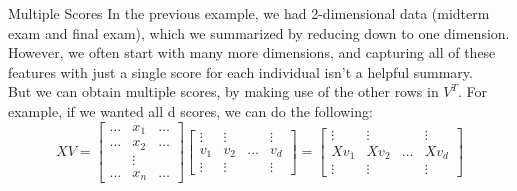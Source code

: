 \documentclass[aspectratio=169]{../latex_main/tntbeamer}  %
\begin{document}
	
	\begin{frame}{Multiple Scores}
	    In the previous example, we had 2-dimensional data (midterm exam and final exam), which we summarized by reducing down to one dimension.\\
	    However, we often start with many more dimensions, and capturing all of these features with just a single score for each individual isn’t a helpful summary. \\
	    But we can obtain multiple scores, by making use of the other rows in $V^T$. For example, if we wanted all d scores, we can do the following:
	    \begin{equation*}
	        XV = \left[\begin{array}{ccc}
	           \dots  &  x_1 & \dots \\
	           \dots  &  x_2 & \dots \\
	                  & \vdots & \\
	           \dots  & x_n  & \dots       
	        \end{array}\right]
	        \left[\begin{array}{cccc}
	           \vdots  &  \vdots &  &  \vdots \\
	           v_1     &  v_2    & \dots &  v_d \\
	           \vdots  & \vdots  &    & \vdots   
	        \end{array}\right] = \left[\begin{array}{cccc}
	           \vdots  &  \vdots &  &  \vdots \\
	           Xv_1     &  Xv_2    & \dots &  Xv_d \\
	           \vdots  & \vdots  &    & \vdots   
	        \end{array}\right]
	    \end{equation*}
	\end{frame}
	
\end{document}
